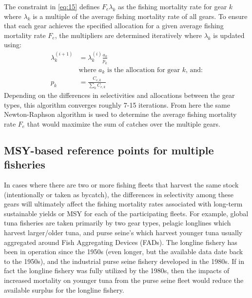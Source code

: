 The constraint in \eqref{eq:15} defines $F_e\lambda_k$ as the fishing mortality rate for gear $k$ where $\lambda_k$ is a multiple of the average fishing mortality rate of all gears.  To ensure that each gear achieves the specified allocation for a given average fishing mortality rate $F_e$, the multipliers are determined iteratively where $\lambda_k$ is updated using:
\begin{align}
	\lambda_k^{(i+1)} &= \lambda_k^{(i)} \frac{a_k}{p_k} \label{eq:16}\\
	&\mbox{where $a_k$ is the allocation for gear $k$, and:}\nonumber\\
	p_k &= \frac{C_{e,k}}{\sum_k C_{e,k}}\label{eq:17}
\end{align}
Depending on the differences in selectivities and allocations between the gear types, this algorithm converges roughly 7-15 iterations.  From here the same Newton-Raphson algorithm is used to determine the average fishing mortality rate $F_e$ that would maximize the sum of catches over the multiple gears.  



\subsection{MSY-based reference points for multiple fisheries} %
\label{sub:msy_based_reference_points_for_multiple_fisheries}

In cases where there are two or more fishing fleets that harvest the same stock (intentionally or taken as bycatch), the differences in selectivity among these gears will ultimately affect the fishing mortality rates associated with long-term sustainable yields or MSY for each of the participating fleets.  For example, global tuna fisheries are taken primarily by two gear types, pelagic longlines which harvest larger/older tuna, and purse seine's which harvest younger tuna usually aggregated around Fish Aggregating Devices (FADs).  The longline fishery has been in operation since the 1950s (even longer, but the available data date back to the 1950s), and the industrial purse seine fishery developed in the 1980s.  If in fact the longline fishery was fully utilized by the 1980s, then the impacts of increased mortality on younger tuna from the purse seine fleet would reduce the available surplus for the longline fishery.

